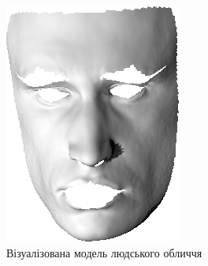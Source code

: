 \begin{figure}[h]
  \centering
  \begin{subfigure}[b]{0.4\textwidth}
    \centering
    \includegraphics[width=\textwidth]{images/statue-orig}
    \caption{Візуалізована модель людського обличчя}
    \label{fig:argmin:statue-original}
  \end{subfigure}
  \begin{subfigure}[b]{0.4\textwidth}
    \centering

\end{subfigure}
\end{figure}
